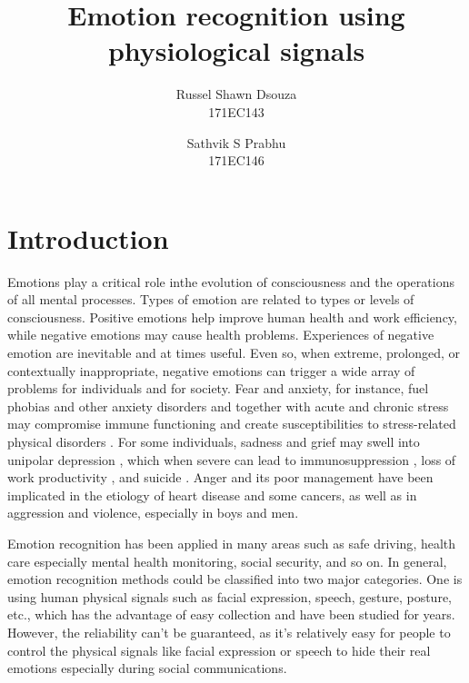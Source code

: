 \documentclass[11pt]{article}
\title{\textbf{Emotion recognition using physiological signals}}
\author{
  Russel Shawn Dsouza\\
  171EC143
  \and
  Sathvik S Prabhu\\
  171EC146
}
\date{}
\theoremstyle{definition}
\begin{document}
  \maketitle

  \section{Introduction}
    Emotions play a critical role inthe evolution of consciousness and the operations of all mental processes. Types of emotion are related to types or levels of consciousness.\cite{izard_emotion_2009}
    Positive emotions help improve human health and work efficiency, while negative emotions may cause health problems.
    Experiences of negative emotion are inevitable and at times useful. Even so, when extreme, prolonged, or contextually inappropriate, negative emotions can trigger a wide array of problems for individuals and for society. 
    Fear and anxiety, for instance, fuel phobias and other anxiety disorders \cite{ohman_automatic_1993} and together with acute and chronic stress may compromise immune functioning and create susceptibilities to stress-related physical disorders \cite{oleary_stress_1990}. 
    For some individuals, sadness and grief may swell into unipolar depression \cite{nolen-hoeksema_response_1993}, which when severe can lead to immunosuppression \cite{oleary_stress_1990}, loss of work productivity \cite{coryell_enduring_1993}, and suicide \cite{chen_lifetime_1996}. 
    Anger and its poor management have been implicated in the etiology of heart disease\cite{barefoot_hostility_1983, fredrickson_hostility_2000, scheier_person_1995} and some cancers\cite{eysenck_cancer_1994, greer_psychological_1975}, as well as in aggression and violence, especially in boys and men\cite{buss_evolution_2016, lemerise_development_2008}.

    Emotion recognition has been applied in many areas such as safe driving\cite{de_nadai_enhancing_2016}, health care\cite{guo_pervasive_2013} especially mental health monitoring\cite{verschuere_psychopathy_2006}, social security\cite{noauthor_facial_nodate}, and so on. 
    In general, emotion recognition methods could be classified into two major categories. 
    One is using human physical signals such as facial expression, speech, gesture, posture, etc., which has the advantage of easy collection and have been studied for years. 
    However, the reliability can’t be guaranteed, as it’s relatively easy for people to control the physical signals like facial expression or speech to hide their real emotions especially during social communications.
\end{document}
